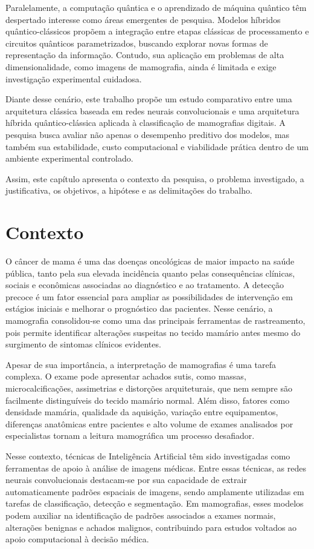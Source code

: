 \documentclass[
    12pt,
    openright,
    oneside,
    a4paper,
    english,
    brazil
]{abntex2}
\begin{document}
Paralelamente, a computação quântica e o aprendizado de máquina quântico têm despertado interesse como áreas emergentes de pesquisa. Modelos híbridos quântico-clássicos propõem a integração entre etapas clássicas de processamento e circuitos quânticos parametrizados, buscando explorar novas formas de representação da informação. Contudo, sua aplicação em problemas de alta dimensionalidade, como imagens de mamografia, ainda é limitada e exige investigação experimental cuidadosa.

Diante desse cenário, este trabalho propõe um estudo comparativo entre uma arquitetura clássica baseada em redes neurais convolucionais e uma arquitetura híbrida quântico-clássica aplicada à classificação de mamografias digitais. A pesquisa busca avaliar não apenas o desempenho preditivo dos modelos, mas também sua estabilidade, custo computacional e viabilidade prática dentro de um ambiente experimental controlado.

Assim, este capítulo apresenta o contexto da pesquisa, o problema investigado, a justificativa, os objetivos, a hipótese e as delimitações do trabalho.

\section{Contexto}

O câncer de mama é uma das doenças oncológicas de maior impacto na saúde pública, tanto pela sua elevada incidência quanto pelas consequências clínicas, sociais e econômicas associadas ao diagnóstico e ao tratamento. A detecção precoce é um fator essencial para ampliar as possibilidades de intervenção em estágios iniciais e melhorar o prognóstico das pacientes. Nesse cenário, a mamografia consolidou-se como uma das principais ferramentas de rastreamento, pois permite identificar alterações suspeitas no tecido mamário antes mesmo do surgimento de sintomas clínicos evidentes.

Apesar de sua importância, a interpretação de mamografias é uma tarefa complexa. O exame pode apresentar achados sutis, como massas, microcalcificações, assimetrias e distorções arquiteturais, que nem sempre são facilmente distinguíveis do tecido mamário normal. Além disso, fatores como densidade mamária, qualidade da aquisição, variação entre equipamentos, diferenças anatômicas entre pacientes e alto volume de exames analisados por especialistas tornam a leitura mamográfica um processo desafiador.

Nesse contexto, técnicas de Inteligência Artificial têm sido investigadas como ferramentas de apoio à análise de imagens médicas. Entre essas técnicas, as redes neurais convolucionais destacam-se por sua capacidade de extrair automaticamente padrões espaciais de imagens, sendo amplamente utilizadas em tarefas de classificação, detecção e segmentação. Em mamografias, esses modelos podem auxiliar na identificação de padrões associados a exames normais, alterações benignas e achados malignos, contribuindo para estudos voltados ao apoio computacional à decisão médica.
\end{document}
